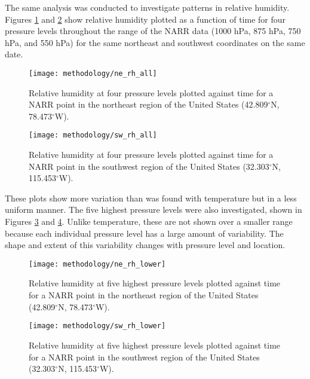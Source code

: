 \documentclass{book}
\begin{document}
The same analysis was conducted to investigate patterns in relative humidity.  Figures \ref{fig:ne_rh_all} and \ref{fig:sw_rh_all} show relative humidity plotted as a function of time for four pressure levels throughout the range of the NARR data (1000 hPa, 875 hPa, 750 hPa, and 550 hPa) for the same northeast and southwest coordinates on the same date.  

\begin{figure}[H]
\centering
\texttt{[image: methodology/ne\_rh\_all]}
\caption{Relative humidity at four pressure levels plotted against time for a NARR point in the northeast region of the United States (42.809$^\circ$N, 78.473$^\circ$W).}
\label{fig:ne_rh_all}
\end{figure}

\begin{figure}[H]
\centering
\texttt{[image: methodology/sw\_rh\_all]}
\caption{Relative humidity at four pressure levels plotted against time for a NARR point in the southwest region of the United States (32.303$^\circ$N, 115.453$^\circ$W).}
\label{fig:sw_rh_all}
\end{figure}

These plots show more variation than was found with temperature but in a less uniform manner.  The five highest pressure levels were also investigated, shown in Figures \ref{fig:ne_rh_lower} and \ref{fig:sw_rh_lower}.  Unlike temperature, these are not shown over a smaller range because each individual pressure level has a large amount of variability.  The shape and extent of this variability changes with pressure level and location.

\begin{figure}[H]
\centering
\texttt{[image: methodology/ne\_rh\_lower]}
\caption{Relative humidity at five highest pressure levels plotted against time for a NARR point in the northeast region of the United States (42.809$^\circ$N, 78.473$^\circ$W).}
\label{fig:ne_rh_lower}
\end{figure}

\begin{figure}[H]
\centering
\texttt{[image: methodology/sw\_rh\_lower]}
\caption{Relative humidity at five highest pressure levels plotted against time for a NARR point in the southwest region of the United States (32.303$^\circ$N, 115.453$^\circ$W).}
\label{fig:sw_rh_lower}
\end{figure}
\end{document}
